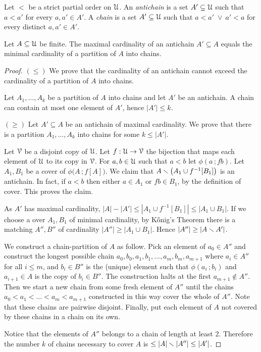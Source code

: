 \documentclass[scombinatorics.tex]{subfiles}
\begin{document}
Let $<$ be a strict partial order on $\EuScript U$.
An \emph{antichain\/} is a set $A'\subseteq\EuScript U$ such that $a<a'$ for every $a,a'\in A'$. A \emph{chain\/} is a set $A'\subseteq\EuScript U$ such that $a<a'\;\vee\ a'<a$ for every distinct $a,a'\in A'$.

\begin{void_thm}
  Let $A\subseteq\EuScript U$ be finite. 
  The maximal cardinality of an antichain $A'\subseteq A$ equals the minimal cardinality of a partition of $A$ into chains. 
\end{void_thm}

\begin{proof}
  $(\le)$ 
  We prove that the cardinality of an antichain cannot exceed the cardinality of a partition of $A$ into chains.

  Let $A_1,\dots,A_k$ be a partition of $A$ into chains and let $A'$ be an antichain.
  A chain can contain at most one element of $A'$, hence $|A'|\le k$.

  $(\ge)$  
  Let $A'\subseteq A$ be an antichain of maximal cardinality.
  We prove that there is a partition $A_1,\dots,A_k$ into chains for some $k\le|A'|$.


  Let $\EuScript V$ be a disjoint copy of $\EuScript U$.
  Let $f:\EuScript U\to\EuScript V$ the bijection that maps each element of $\EuScript U$ to its copy in $\EuScript V$.
  For $a,b\in\EuScript U$ such that $a<b$ let $\phi(a\,;fb)$.
  Let $A_1,B_1$ be a cover of $\phi\big(A\,;f[A]\big)$.
  We claim that $A \smallsetminus \big(A_1\cup f^{-1}[B_1]\big)$ is an antichain.
  In fact, if $a<b$ then either $a\in A_1$ or $fb\in B_1$, by the definition of cover.
  This proves the claim.

  As $A'$ has maximal cardinality, $|A| - |A'|\le |A_1\cup f^{-1}[B_1]|\le |A_1\cup B_1|$.
  If we choose a over $A_1,B_1$ of minimal cardinality, by K\H{o}nig's Theorem there is a matching $A'',B''$ of cardinality $|A''|\ge |A_1\cup B_1|$. Hence $|A''|\ge |A\smallsetminus A'|$.

  We construct a chain-partition of $A$ as follow.
  Pick an element of $a_0\in A''$ and construct the longest possible chain $a_0,b_0,a_1,b_1,\dots,a_m,b_m,a_{m+1}$ where $a_i\in A''$ for all $i\le m$, and $b_i\in B''$ is the (unique) element such that $\phi(a_i\,;b_i)$ and $a_{i+1}\in A$ is the copy of $b_i\in B''$.
  The construction halts at the first $a_{m+1}\not\in A''$.
  Then we start a new chain from some fresh element of $A''$ until the chains $a_0<a_1<\dots<a_m<a_{m+1}$ constructed in this way cover the whole of $A''$.
  Note that these chains are pairwise disjoint.
  Finally, put each element of $A$ not covered by these chains in a chain on its own.
  
  Notice that the elements of $A''$ belongs to a chain of length at least 2.
  Therefore the number $k$ of chains necessary to cover $A$ is $\le |A|\smallsetminus |A''| \le  |A'|$.
\end{proof}
\end{document}
